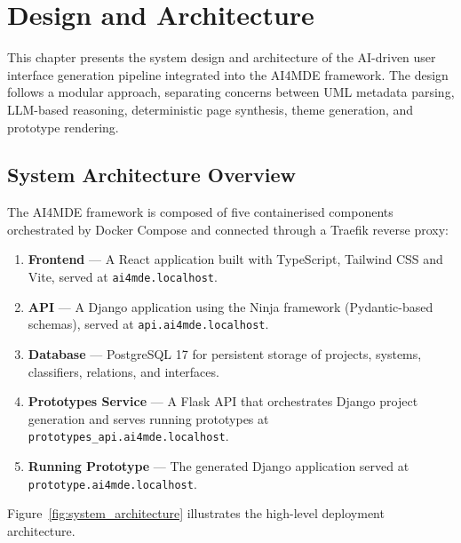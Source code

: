 
\section{Design and Architecture}

This chapter presents the system design and architecture of the AI-driven user interface generation pipeline integrated into the AI4MDE framework. The design follows a modular approach, separating concerns between UML metadata parsing, LLM-based reasoning, deterministic page synthesis, theme generation, and prototype rendering.

\subsection{System Architecture Overview}

The AI4MDE framework is composed of five containerised components orchestrated by Docker Compose and connected through a Traefik reverse proxy:

\begin{enumerate}
    \item \textbf{Frontend} — A React application built with TypeScript, Tailwind CSS and Vite, served at \texttt{ai4mde.localhost}.
    \item \textbf{API} — A Django application using the Ninja framework (Pydantic-based schemas), served at \texttt{api.ai4mde.localhost}.
    \item \textbf{Database} — PostgreSQL 17 for persistent storage of projects, systems, classifiers, relations, and interfaces.
    \item \textbf{Prototypes Service} — A Flask API that orchestrates Django project generation and serves running prototypes at \texttt{prototypes\_api.ai4mde.localhost}.
    \item \textbf{Running Prototype} — The generated Django application served at \texttt{prototype.ai4mde.localhost}.
\end{enumerate}

Figure~\ref{fig:system_architecture} illustrates the high-level deployment architecture.

